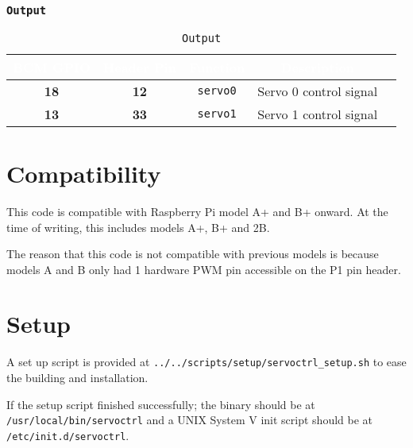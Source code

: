    \subsubsection{\texttt{Output}}
   \begin{table}[!htb]
      \begin{center}
         \begin{tabular}{|c|c|c|c|c|}
            \rowcolor{black}
            \textcolor{white}{\textbf{BCM GPIO}}  &
            \textcolor{white}{\textbf{Header Pin}} &
            \textcolor{white}{\textbf{Function}} &
            \textcolor{white}{\textbf{Description}}\\
            \hline
            \hline
            \textbf{18} & \textbf{12} &
					\texttt{servo0} & Servo 0 control signal \\
            \hline
            \textbf{13} & \textbf{33} &
					\texttt{servo1} & Servo 1 control signal \\
            \hline
         \end{tabular}
         \caption{\texttt{Output}}
         \label{table:output}
      \end{center}
   \end{table}

\section{Compatibility}
This code is compatible with Raspberry Pi model A+ and B+ onward. At the time of
writing, this includes models A+, B+ and 2B.

The reason that this code is not compatible with previous models is because
models A and B only had 1 hardware PWM pin accessible on the P1 pin header.

\section{Setup}
A set up script is provided at \texttt{../../scripts/setup/servoctrl\_setup.sh}
to ease the building and installation.

If the setup script finished successfully; the binary should be at\\
\texttt{/usr/local/bin/servoctrl} and a UNIX System V init script should be at\\
\texttt{/etc/init.d/servoctrl}.

